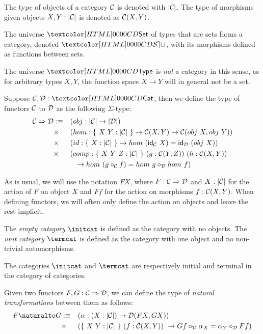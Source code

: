 The type of objects of a category $\mathcal{C}$ is denoted with $| \mathcal{C} |$. The
type of morphisms given objects $X, Y : | \mathcal{C} |$ is denoted as
$\mathcal{C}(X,Y)$.

\begin{example}
  The universe $\Set$ of types that are sets forms a category, denoted
  $\SET$, with its morphisms defined as functions between sets.
\end{example}

\begin{remark}
  The universe $\Type$ is \emph{not} a category in this sense, as for
  arbitrary types $X, Y$, the function space $X \to Y$ will in general
  not be a set.
\end{remark}

\begin{definition}[Functor]
  Suppose $\Cc, \Dd : \Cat$, then we define the type of functors $\mathcal{C}$
  to $\mathcal{D}$ as the following $\Sigma$-type:
  \begin{align*}
    \Func{\Cc}{\Dd} &\ddefeq &&(obj : | \Cc | \to | \Dd |) \\
    &\times &&(hom : \{\ X\ Y : | \Cc |\ \} \to \Cc(X,Y) \to \Cc(obj\ X, obj\ Y)) \\
    &\times &&(id : \{\ X : | \Cc |\ \} \to hom\ (\id_{\Cc}\ X) = \id_{\Dd}\ (obj\ X)) \\
    &\times &&(comp : \{\ X\ Y\ Z : | \Cc |\ \}\ (g : \Cc(Y,Z))\ (h : \Cc(X,Y)) \\
    &&&\ \ \to hom\ (g \circ_{\Cc} f) = hom\ g \circ_{\Dd} hom\ f)
  \end{align*}
\end{definition}

As is usual, we will use the notation $F X$, where
$F : \mathcal{C} \Rightarrow \mathcal{D}$ and $X : | \mathcal{C} |$ for the action of $F$ on
object $X$ and $F f$ for the action on morphisms $f : \mathcal{C}(X,Y)$. When
defining functors, we will often only define the action on objects and
leave the rest implicit.

\begin{definition}
  The \emph{empty category} $\initcat$ is defined as the category with
  no objects. The \emph{unit category} $\termcat$ is defined as the
  category with one object and no non-trivial automorphisms.
\end{definition}

The categories $\initcat$ and $\termcat$ are respectively initial and
terminal in the category of categories.

\begin{definition}
  Given two functors $F, G : \mathcal{C} \Rightarrow \mathcal{D}$, we can define the type
  of \emph{natural transformations} between them as follows:
  \begin{align*}
    \Nat{F}{G} &\ddefeq &&(\alpha : (X : | \Cc |) \to \Dd(FX,GX)) \\
    &\times &&(\{\ X\ Y : | \Cc |\ \}\ (f : \Cc(X,Y))\ \to Gf \circ_{\Dd} \alpha_X = \alpha_Y \circ_{\Dd} Ff)
  \end{align*}
\end{definition}

